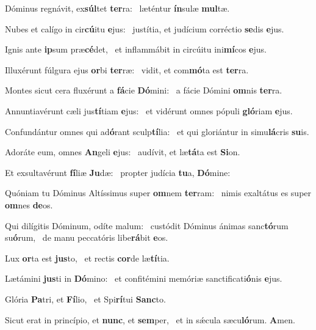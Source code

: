 \item Dóminus regnávit, ex\textbf{súl}tet \textbf{ter}ra:~\psstar{} læténtur \textbf{ín}sulæ \textbf{mul}tæ.
\item Nubes et calígo in cir\textbf{cú}itu \textbf{e}jus:~\psstar{} justítia, et judícium corréctio \textbf{se}dis \textbf{e}jus.
\item Ignis ante \textbf{ip}sum præ\textbf{cé}det,~\psstar{} et inflammábit in circúitu ini\textbf{mí}cos \textbf{e}jus.
\item Illuxérunt fúlgura ejus \textbf{or}bi \textbf{ter}ræ:~\psstar{} vidit, et com\textbf{mó}ta est \textbf{ter}ra.
\item Montes sicut cera fluxérunt a \textbf{fá}cie \textbf{Dó}mini:~\psstar{} a fácie Dómini \textbf{om}nis \textbf{ter}ra.
\item Annuntiavérunt cæli jus\textbf{tí}tiam \textbf{e}jus:~\psstar{} et vidérunt omnes pópuli \textbf{gló}riam \textbf{e}jus.
\item Confundántur omnes qui ad\textbf{ó}rant sculp\textbf{tí}lia:~\psstar{} et qui gloriántur in simu\textbf{lá}cris \textbf{su}is.
\item Adoráte eum, omnes \textbf{An}geli \textbf{e}jus:~\psstar{} audívit, et læ\textbf{tá}ta est \textbf{Si}on.
\item Et exsultavérunt \textbf{fí}liæ \textbf{Ju}dæ:~\psstar{} propter judícia \textbf{tu}a, \textbf{Dó}mine:
\item Quóniam tu Dóminus Altíssimus super \textbf{om}nem \textbf{ter}ram:~\psstar{} nimis exaltátus es super \textbf{om}nes \textbf{de}os.
\item Qui dilígitis Dóminum, odíte malum:~\pscross{} custódit Dóminus ánimas sanc\textbf{tó}rum su\textbf{ó}rum,~\psstar{} de manu peccatóris libe\textbf{rá}bit \textbf{e}os.
\item Lux \textbf{or}ta est \textbf{jus}to,~\psstar{} et rectis \textbf{cor}de læ\textbf{tí}tia.
\item Lætámini \textbf{jus}ti in \textbf{Dó}mino:~\psstar{} et confitémini memóriæ sanctificati\textbf{ó}nis \textbf{e}jus.
\item Glória \textbf{Pa}tri, et \textbf{Fí}lio,~\psstar{} et Spi\textbf{rí}tui \textbf{Sanc}to.
\item Sicut erat in princípio, et \textbf{nunc}, et \textbf{sem}per,~\psstar{} et in sǽcula sæcu\textbf{ló}rum. \textbf{A}men.
